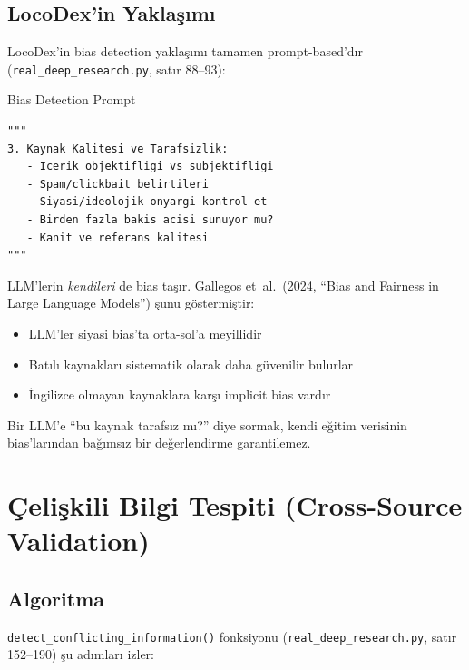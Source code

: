 \subsection{LocoDex'in Yakla\c{s}{\i}m{\i}}

LocoDex'in bias detection yakla\c{s}{\i}m{\i} tamamen prompt-based'd{\i}r (\texttt{real\_deep\_research.py}, sat{\i}r 88--93):

\begin{kodref}{Bias Detection Prompt}
\begin{lstlisting}
"""
3. Kaynak Kalitesi ve Tarafsizlik:
   - Icerik objektifligi vs subjektifligi
   - Spam/clickbait belirtileri
   - Siyasi/ideolojik onyargi kontrol et
   - Birden fazla bakis acisi sunuyor mu?
   - Kanit ve referans kalitesi
"""
\end{lstlisting}
\end{kodref}

\begin{dikkat}
LLM'lerin \emph{kendileri} de bias ta\c{s}{\i}r. Gallegos et~al.\ (2024, ``Bias and Fairness in Large Language Models'') \c{s}unu g\"{o}stermi\c{s}tir:
\begin{itemize}[leftmargin=1.5em]
  \item LLM'ler siyasi bias'ta orta-sol'a meyillidir
  \item Bat{\i}l{\i} kaynaklar{\i} sistematik olarak daha g\"{u}venilir bulurlar
  \item \.{I}ngilizce olmayan kaynaklara kar\c{s}{\i} implicit bias vard{\i}r
\end{itemize}
Bir LLM'e ``bu kaynak tarafs{\i}z m{\i}?'' diye sormak, kendi e\u{g}itim verisinin bias'lar{\i}ndan ba\u{g}{\i}ms{\i}z bir de\u{g}erlendirme garantilemez.
\end{dikkat}


\section{\c{C}eli\c{s}kili Bilgi Tespiti (Cross-Source Validation)}
\label{sec:cross-source}

\subsection{Algoritma}

\texttt{detect\_conflicting\_information()} fonksiyonu (\texttt{real\_deep\_research.py}, sat{\i}r 152--190) \c{s}u ad{\i}mlar{\i} izler:

